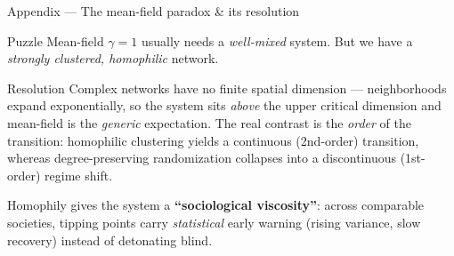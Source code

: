 \documentclass[aspectratio=169,11pt]{beamer}
\newcommand{\emphr}[1]{{\color{ndreddark}\textbf{#1}}}
\begin{document}
\begin{frame}{Appendix — The mean-field paradox \& its resolution}
\begin{block}{\small Puzzle}
\small Mean-field $\gamma=1$ usually needs a \emph{well-mixed} system.
But we have a \emph{strongly clustered, homophilic} network.
\end{block}
\vspace{0.1cm}
\begin{block}{\small Resolution}
\footnotesize Complex networks have no finite spatial dimension — neighborhoods expand
exponentially, so the system sits \emph{above} the upper critical dimension and mean-field
is the \emph{generic} expectation. The real contrast is the \emph{order} of the transition:
homophilic clustering yields a continuous (2nd-order) transition, whereas degree-preserving
randomization collapses into a discontinuous (1st-order) regime shift.
\end{block}
\vspace{0.1cm}
\begin{center}\small
Homophily gives the system a \emphr{``sociological viscosity''}: across comparable societies,
tipping points carry \emph{statistical} early warning (rising variance, slow recovery)
instead of detonating blind.
\end{center}
\end{frame}
\end{document}
